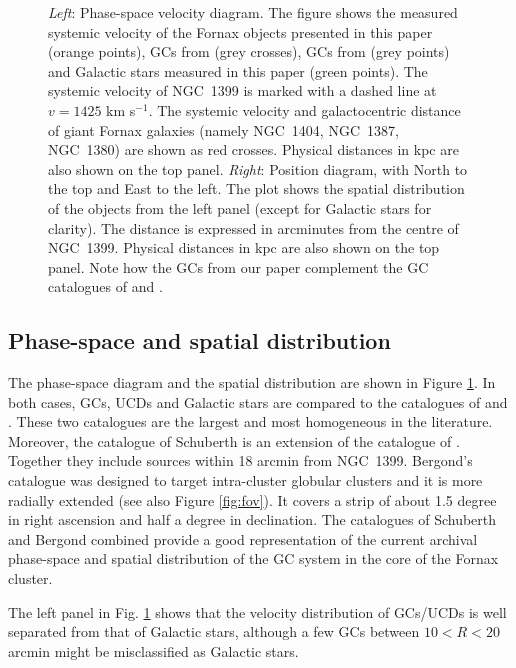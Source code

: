 \documentclass[useAMS,usenatbib]{mn2e}
\begin{document}
\begin{figure}
\caption{\textit{Left}: Phase-space velocity diagram. The figure shows the 
measured systemic velocity of the Fornax objects presented in this paper 
(orange points), GCs from \citet{Schuberth} (grey crosses), GCs from 
\citet{Bergond07} (grey points) and Galactic stars measured in this paper 
(green points). The systemic velocity of NGC~1399 is marked with a dashed line 
at $v = 1425$ km s$^{-1}$. The systemic velocity and galactocentric distance of 
giant Fornax galaxies (namely NGC~1404, NGC~1387, NGC~1380) are shown as red 
crosses. Physical distances in kpc are also shown on the top panel. 
\textit{Right}: Position diagram, with North to the top and East to the left. 
The plot shows the spatial distribution of the objects from the left panel 
(except for Galactic stars for clarity). The distance is expressed in 
arcminutes from the centre of NGC~1399. Physical distances in kpc are also 
shown on the top panel.  Note how the GCs from our paper complement the GC 
catalogues of \citet{Schuberth} and \citet{Bergond07}. }
\label{fig:phase-space}
\end{figure}

\subsection{Phase-space and spatial distribution}

The phase-space diagram and the spatial distribution are shown in Figure 
\ref{fig:phase-space}. In both cases, GCs, UCDs and Galactic stars are compared 
to the catalogues of \citet{Bergond07} and \citet{Schuberth}. These two 
catalogues are the largest and most homogeneous in the literature. Moreover, 
the catalogue of Schuberth is an extension of the catalogue of 
\citet{Dirsch04}. Together they include sources within 18 arcmin from NGC~1399. 
Bergond's catalogue was designed to target intra-cluster globular clusters and 
it is more radially extended (see also Figure \ref{fig:fov}). It covers a strip 
of about 1.5 degree in right ascension and half a degree in declination. The 
catalogues of Schuberth and Bergond combined provide a good representation of 
the current archival phase-space and spatial distribution of the GC system in 
the core of the Fornax cluster. 

The left panel in Fig. \ref{fig:phase-space} shows that the velocity 
distribution of GCs/UCDs is well separated from that of Galactic stars, 
although a few GCs between $10<R<20$ arcmin might be misclassified as Galactic 
stars. 
\end{document}
